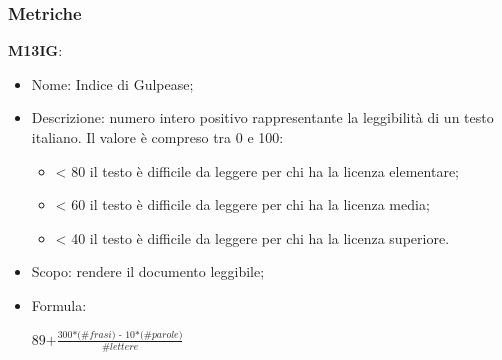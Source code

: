 \subsubsection{Metriche}
\textbf{M13IG}:
    \begin{itemize}
      \item Nome: Indice di Gulpease;
      \item Descrizione: numero intero positivo rappresentante la leggibilità di un testo italiano. Il valore è compreso tra 0 e 100:
           \begin{itemize}
                \item < 80 il testo è difficile da leggere per chi ha la licenza elementare;
                \item < 60 il testo è difficile da leggere per chi ha la licenza media;
                \item < 40 il testo è difficile da leggere per chi ha la licenza superiore.
           \end{itemize}
      \item Scopo: rendere il documento leggibile;
      \item Formula:
      \begin{center}
        $ \textit{89+}\frac{\textit{300*(\#frasi) - 10*(\#parole)}}{\textit{\#lettere}}$
      \end{center}
\end{itemize}